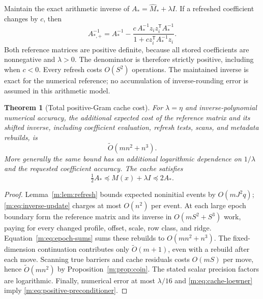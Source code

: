 \documentclass[11pt]{amsart}
\newtheorem{theorem}{Theorem}[section]
\theoremstyle{definition}\newtheorem{definition}[theorem]{Definition}
\theoremstyle{remark}\newtheorem{remark}[theorem]{Remark}
\numberwithin{equation}{section}
\begin{document}
Maintain the exact arithmetic inverse of
$A_* =\widehat M_*+\lambda I$. If a refreshed coefficient changes by $c$,
then
\begin{equation}
 A_{*,+}^{-1}=A_*^{-1}
 -\frac{c\,A_*^{-1}z_iz_i^{\mathsf T}A_*^{-1}}
               {1+c z_i^{\mathsf T}A_*^{-1}z_i}.           \label{m:eq:inverse-update}
\end{equation}
Both reference matrices are positive definite, because all stored
coefficients are nonnegative and $\lambda>0$. The denominator is therefore
strictly positive, including when $c<0$. Every refresh costs $O(S^2)$
operations. The maintained inverse is exact for the numerical reference;
no accumulation of inverse-rounding error is assumed in this arithmetic
model.

\begin{theorem}[Total positive-Gram cache cost]\label{m:thm:cachecost}
For $\lambda=\eta$ and inverse-polynomial numerical accuracy, the additional
expected cost of the reference matrix and its shifted inverse, including
coefficient evaluation, refresh tests, scans, and metadata rebuilds, is
\[
                         \widetilde O(mn^2+n^3).
\]
More generally the same bound has an additional logarithmic dependence on
$1/\lambda$ and the requested coefficient accuracy. The cache satisfies
\begin{equation}
        \tfrac12 A_*\preceq M(x)+\lambda I\preceq2A_*.
                                                               \label{m:eq:positive-preconditioner}
\end{equation}
\end{theorem}
\begin{proof}
Lemma~\ref{m:lem:refresh} bounds expected noninitial events by $O(mJ^2q)$;
\eqref{m:eq:inverse-update} charges at most $O(n^2)$ per event.
At each large epoch boundary form the reference matrix and its inverse in
$O(mS^2+S^3)$ work, paying for every changed profile, offset, scale, row
class, and ridge. Equation~\eqref{m:eq:epoch-sums} sums these rebuilds to
$O(mn^2+n^3)$. The fixed-dimension continuation contributes only
$\widetilde O(m+1)$, even with a rebuild after each move.
Scanning true barriers and cache residuals costs $O(mS)$ per move, hence
$\widetilde O(mn^2)$ by Proposition~\ref{m:prop:coin}. The stated scalar
precision factors are logarithmic. Finally, numerical error at most
$\lambda/16$ and \eqref{m:eq:cache-loewner} imply
\eqref{m:eq:positive-preconditioner}.
\end{proof}
\end{document}

